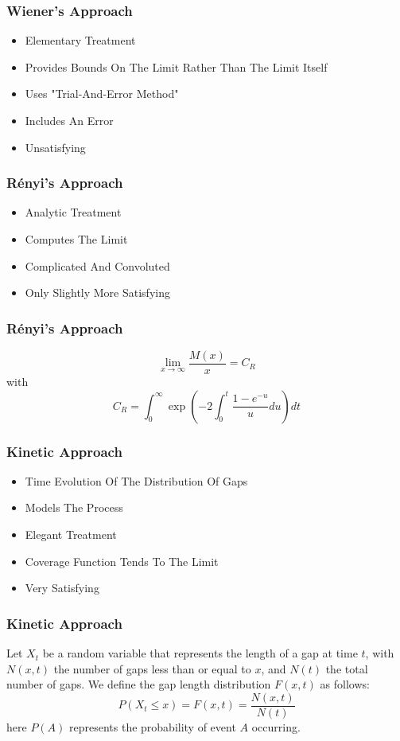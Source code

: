 \documentclass{beamer}
\begin{document}
\begin{frame}
    \frametitle{Wiener's Approach}
    \begin{itemize}
        \item Elementary Treatment
        \item Provides Bounds On The Limit Rather Than The Limit Itself
        \item Uses "Trial-And-Error Method"
        \item Includes An Error
        \item Unsatisfying
    \end{itemize}
\end{frame}

\begin{frame}
    \frametitle{R\'enyi's Approach}
    \begin{itemize}
        \item Analytic Treatment
        \item Computes The Limit
        \item Complicated And Convoluted
        \item Only Slightly More Satisfying
    \end{itemize}
\end{frame}

\begin{frame}
    \frametitle{R\'enyi's Approach}
	\[
		\lim_{x \to \infty} \frac{M(x)}{x} = C_R
	\]
	with
	\[
		C_R = \int_{0}^{\infty} \exp \left( -2 \int_{0}^{t} \frac{1 - e^{-u}}{u} du \right) dt
	\]
\end{frame}



\begin{frame}
    \frametitle{Kinetic Approach}
    \begin{itemize}
        \item Time Evolution Of The Distribution Of Gaps
        \item Models The Process
        \item Elegant Treatment
        \item Coverage Function Tends To The Limit
        \item Very Satisfying
    \end{itemize}
\end{frame}

\begin{frame}
	\frametitle{Kinetic Approach}
	Let $X_t$ be a random variable that represents the length of a gap at 
	time $t$, with $N(x, t)$ the number of gaps less than or equal to $x$, 
	and $N(t)$ the total number of gaps. We define the gap length 
	distribution $F(x, t)$ as follows:
	\[
		P(X_t \leq x) = F(x, t) = \frac{N(x, t)}{N(t)}
	\]
	here $P(A)$ represents the probability of event $A$ occurring.
\end{frame}
\end{document}
